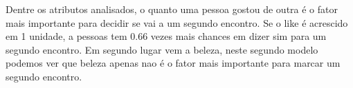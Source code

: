 \documentclass[]{article}
\begin{document}
Dentre os atributos analisados, o quanto uma pessoa gostou de outra é o
fator mais importante para decidir se vai a um segundo encontro. Se o
like é acrescido em 1 unidade, a pessoas tem 0.66 vezes mais chances em
dizer sim para um segundo encontro. Em segundo lugar vem a beleza, neste
segundo modelo podemos ver que beleza apenas nao é o fator mais
importante para marcar um segundo encontro.
\end{document}
